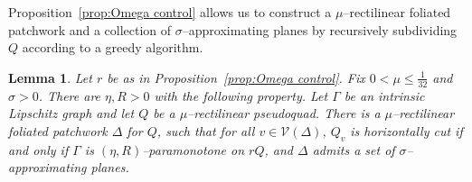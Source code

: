 \documentclass[11pt,reqno]{amsart}
\newcommand{\cV}{\mathcal{V}}
\newcommand{\0}{\mathbf{0}}
\renewcommand{\1}{\mathbf 1}
\renewcommand{\le}{\leqslant}
\newtheorem{lemma}[thm]{Lemma}
\theoremstyle{remark}
\begin{document}
Proposition~\ref{prop:Omega control} allows us to construct a $\mu$--rectilinear foliated patchwork and a collection of $\sigma$--approximating planes by recursively subdividing $Q$ according to a greedy algorithm.
\begin{lemma}\label{lem:subdivision algorithm}
  Let $r$ be as in Proposition~\ref{prop:Omega control}.  Fix $0<\mu \le\frac{1}{32}$ and $\sigma >0$.  There are $\eta,R>0$ with the following property.  Let $\Gamma$ be an intrinsic Lipschitz graph and let $Q$ be a $\mu$--rectilinear pseudoquad. There is a $\mu$--rectilinear foliated patchwork $\Delta$ for $Q$, such that for all $v\in \cV(\Delta)$, $Q_v$ is horizontally cut if and only if $\Gamma$ is $(\eta,R)$--paramonotone on $rQ$, and $\Delta$ admits a set of $\sigma$--approximating planes.
\end{lemma}
\end{document}
